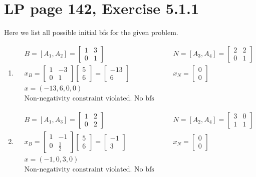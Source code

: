 \documentclass[11pt]{article}
\begin{document}
\section{LP page 142, Exercise 5.1.1}\label{prob:1}

Here we list all possible initial bfs for the given problem.

\begin{enumerate}
    \item \begin{align*}
        & B = [A_1, A_2]=\begin{bmatrix} 1 & 3 \\ 0 & 1\end{bmatrix} & N = [A_3, A_4]=\begin{bmatrix} 2 & 2 \\ 0 & 1\end{bmatrix} \\
        & x_B = \begin{bmatrix} 1 & -3 \\ 0 & 1\end{bmatrix} \begin{bmatrix} 5 \\ 6 \end{bmatrix} = \begin{bmatrix} -13 \\ 6 \end{bmatrix} & x_N = \begin{bmatrix} 0 \\ 0\end{bmatrix} \\
        & x = (-13, 6, 0, 0) &\\
        & \text{Non-negativity constraint violated. No bfs generated.} &
    \end{align*}
    
    \item \begin{align*}
        & B = [A_1, A_3]=\begin{bmatrix} 1 & 2 \\ 0 & 2\end{bmatrix} & N = [A_2, A_4]=\begin{bmatrix} 3 & 0 \\ 1 & 1\end{bmatrix} \\
        & x_B = \begin{bmatrix} 1 & -1 \\ 0 & \frac{1}{2}\end{bmatrix} \begin{bmatrix} 5 \\ 6 \end{bmatrix} = \begin{bmatrix} -1 \\ 3 \end{bmatrix} & x_N = \begin{bmatrix} 0 \\ 0\end{bmatrix} \\
        & x = (-1, 0, 3, 0) &\\
        & \text{Non-negativity constraint violated. No bfs generated.} &
    \end{align*}
    

\end{enumerate}
\end{document}
